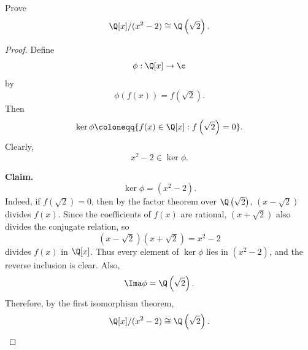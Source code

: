 \begin{example}{
Prove
\[
\Q[x]/(x^2-2)\cong \Q\left(\sqrt{2}\right).
\]
}
\end{example}

\begin{proof}
Define
\[
\phi:\Q[x]\to \c
\]
by
\[
\phi(f(x))=f\left(\sqrt{2}\right).
\]
Then
\[
\ker\phi \coloneqq \{f(x)\in \Q[x]:f\left(\sqrt{2}\right)=0\}.
\]
Clearly,
\[
x^2-2\in \ker\phi.
\]

\textbf{Claim.}
\[
\ker\phi=(x^2-2).
\]
Indeed, if $f\left(\sqrt{2}\right)=0$, then by the factor theorem over $\Q\left(\sqrt{2}\right)$, $(x-\sqrt{2})$ divides $f(x)$.
Since the coefficients of $f(x)$ are rational, $(x+\sqrt{2})$ also divides the conjugate relation, so
\[
\left(x-\sqrt{2}\right)\left(x+\sqrt{2}\right)=x^2-2
\]
divides $f(x)$ in $\Q[x]$.
Thus every element of $\ker\phi$ lies in $(x^2-2)$, and the reverse inclusion is clear.
Also,
\[
\Ima\phi=\Q\left(\sqrt{2}\right).
\]
Therefore, by the first isomorphism theorem,
\[
\Q[x]/(x^2-2)\cong \Q\left(\sqrt{2}\right).
\]
\end{proof}
